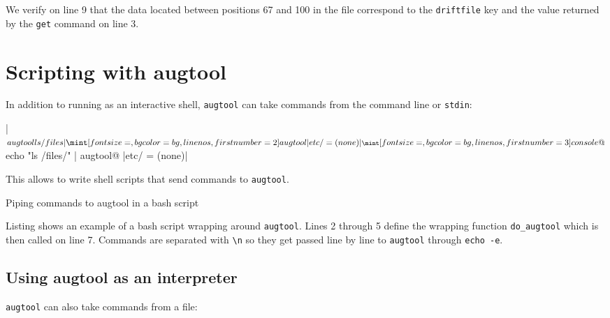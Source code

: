 We verify on line 9 that the data located between positions 67 and 100 in the file correspond to the \verb!driftfile! key and the value returned by the \verb!get! command on line 3.


\section{Scripting with augtool}


In addition to running as an interactive shell, \verb!augtool! can take commands from the command line or \verb!stdin!:

 

\consolecode[linenos]|$ augtool ls /files|
\augtoolcode[linenos,firstnumber=2]|etc/ = (none)|
\consolecode[linenos,firstnumber=3]@$ echo "ls /files/" | augtool@
\augtoolcode[linenos,firstnumber=4]|etc/ = (none)|

This allows to write shell scripts that send commands to \verb!augtool!.

  

\begin{listing}
  \caption{Piping commands to augtool in a bash script}
  \label{lst:augtool_wrap}
\end{listing}


\begin{quote}
\end{quote}

Listing  shows an example of a bash script wrapping around \verb!augtool!. Lines 2 through 5 define the wrapping function \verb!do_augtool! which is then called on line 7. Commands are separated with \verb!\n! so they get passed line by line to \verb!augtool! through \verb!echo -e!.


\subsection{Using augtool as an interpreter}

\verb!augtool! can also take commands from a file:

 


